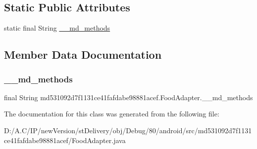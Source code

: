 \subsection*{Static Public Attributes}
\begin{DoxyCompactItemize}
\item 
static final String \hyperlink{classmd531092d7f1131ce41fafdabe98881acef_1_1_food_adapter_ae2ba2b60150a46fd3a3a8c3c3c53cc12}{\+\_\+\+\_\+md\+\_\+methods}
\end{DoxyCompactItemize}


\subsection{Member Data Documentation}
\mbox{\label{classmd531092d7f1131ce41fafdabe98881acef_1_1_food_adapter_ae2ba2b60150a46fd3a3a8c3c3c53cc12}} 
\subsubsection{\texorpdfstring{\+\_\+\+\_\+md\+\_\+methods}{\_\_md\_methods}}
{\footnotesize\ttfamily final String md531092d7f1131ce41fafdabe98881acef.\+Food\+Adapter.\+\_\+\+\_\+md\+\_\+methods\hspace{0.3cm}{\ttfamily [static]}}



The documentation for this class was generated from the following file\+:\begin{DoxyCompactItemize}
\item 
D\+:/\+A.\+C/\+I\+P/new\+Version/st\+Delivery/obj/\+Debug/80/android/src/md531092d7f1131ce41fafdabe98881acef/Food\+Adapter.\+java\end{DoxyCompactItemize}
